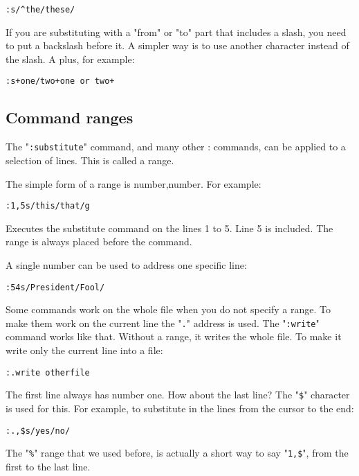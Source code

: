 \begin{Verbatim}[samepage=true]
 :s/^the/these/
\end{Verbatim}

If you are substituting with a "from" or "to" part that includes a slash, you need to put a backslash before it.
A simpler way is to use another character instead of the slash.
A plus, for example:

\begin{Verbatim}[samepage=true]
 :s+one/two+one or two+
\end{Verbatim}
\subsection{Command ranges}
\label{Command ranges}
The "\verb!:substitute!" command, and many other : commands, can be applied to a selection of lines.
This is called a range.

The simple form of a range is {number},{number}.
For example:

\begin{Verbatim}[samepage=true]
 :1,5s/this/that/g
\end{Verbatim}

Executes the substitute command on the lines 1 to 5.
Line 5 is included.
The range is always placed before the command.

A single number can be used to address one specific line:

\begin{Verbatim}[samepage=true]
 :54s/President/Fool/
\end{Verbatim}

Some commands work on the whole file when you do not specify a range.
To make them work on the current line the "\verb!.!" address is used.
The "\verb!:write!" command works like that.
Without a range, it writes the whole file.
To make it write only the current line into a file:

\begin{Verbatim}[samepage=true]
 :.write otherfile
\end{Verbatim}

The first line always has number one.
How about the last line?
The "\verb!$!" character is used for this.
For example, to substitute in the lines from the cursor to the end:

\begin{Verbatim}[samepage=true]
 :.,$s/yes/no/
\end{Verbatim}

The "\verb!%!" range that we used before, is actually a short way to say "\verb!1,$!", from the first to the last line.
